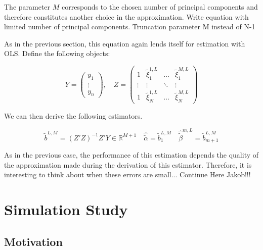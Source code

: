 \documentclass[11pt,twoside,a4paper]{article}
\begin{document}
	The parameter $M$ corresponds to the chosen number of principal components and therefore constitutes another choice in the approximation. {\color{red} Write equation with limited number of principal components. Truncation parameter M instead of N-1}

	As in the previous section, this equation again lends itself for estimation with OLS. Define the following objects:
	
	\begin{equation}
		Y = \begin{pmatrix}
			y_1 \\ \vdots \\ y_n
		\end{pmatrix}, \quad
		Z = \begin{pmatrix}
			1 & \tilde{\xi}^{1,L}_{1} & \dots & \tilde{\xi}^{M,L}_{1} \\
			\vdots & \vdots & \ddots & \vdots \\
			1 & \tilde{\xi}^{1,L}_{N} & \dots & \tilde{\xi}^{M,L}_{N}
		\end{pmatrix}
	\end{equation}
	
	We can then derive the following estimators.
	
	\begin{equation}
		\tilde{b}^{L,M} = \left(Z'Z\right)^{-1}Z'Y \in \mathbb{R}^{M+1} \quad \hat{\tilde{\alpha}} = \tilde{b}_{1}^{L,M} \quad \hat{\tilde{\beta}}^{m,L} = \tilde{b}^{L,M}_{m+1}
	\end{equation}

	As in the previous case, the performance of this estimation depends the quality of the approximation made during the derivation of this estimator. Therefore, it is interesting to think about when these errors are small... {\color{red}Continue Here Jakob!!!}

	\nocite{alexanderian_KLexpansion_2015}
	\nocite{kokoszka_introduction_2017}
	\nocite{hsing_theoretical_2015}
	\nocite{ramsay_functional_2005}
	\nocite{horvath_inference_2012}
	\nocite{cai_prediction_2006}
	\nocite{levitin_introduction_2007}

	\section{Simulation Study}\label{Simulation}

	\subsection{Motivation}
	
\end{document}

